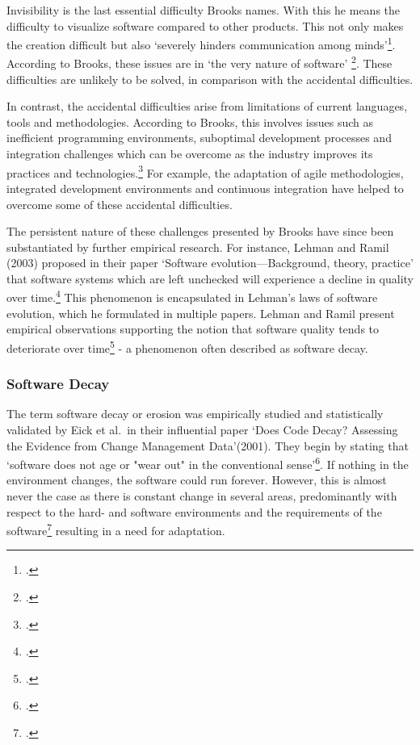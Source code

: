 Invisibility is the last essential difficulty Brooks names. With this he means the difficulty to visualize software compared to other products. This not only makes the creation difficult but also `severely hinders communication among minds'\footcite[4]{brooksNoSilverBullet1987}.
According to Brooks, these issues are in `the very nature of software' \footcite[2]{brooksNoSilverBullet1987}. These difficulties are unlikely to be solved, in comparison with the accidental difficulties.

In contrast, the accidental difficulties arise from limitations of current languages, tools and methodologies. According to Brooks, this involves issues such as inefficient programming environments, suboptimal development processes and integration challenges which can be overcome as the industry improves its practices and technologies.\footcite[5-6]{brooksNoSilverBullet1987}
For example, the adaptation of agile methodologies, integrated development environments and continuous integration have helped to overcome some of these accidental difficulties.

The persistent nature of these challenges presented by Brooks have since been substantiated by further empirical research. For instance, Lehman and Ramil (2003) proposed in their paper `Software evolution—Background, theory, practice' that software systems which are left unchecked will experience a decline in quality over time.\footcite[34]{lehmanSoftwareEvolutionBackground2003}
This phenomenon is encapsulated in Lehman's laws of software evolution, which he formulated in multiple papers.  Lehman and Ramil present empirical observations supporting the notion that software quality tends to deteriorate over time\footcite[42]{lehmanSoftwareEvolutionBackground2003} - a phenomenon often described as
software decay.

\subsubsection{Software Decay}
The term software decay or erosion was empirically studied and statistically validated by Eick et al.\ in their influential paper `Does Code Decay? Assessing the Evidence from Change Management Data'(2001). They begin by stating that `software does not age or "wear out" in the conventional sense'\footcite[1]{eickDoesCodeDecay2001}.
If nothing in the environment changes, the software could run forever. However, this is almost never the case as there is constant change in several areas, predominantly with respect to the hard- and software environments and the requirements of the software\footcite[1]{eickDoesCodeDecay2001} resulting in a need for adaptation.

